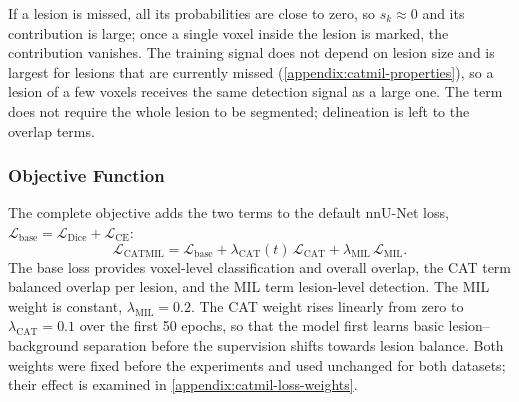 If a lesion is missed, all its probabilities are close to zero, so
$s_k \approx 0$ and its contribution is large; once a single voxel inside
the lesion is marked, the contribution vanishes. The training signal does
not depend on lesion size and is largest for lesions that are currently
missed (\cref{appendix:catmil-properties}), so a lesion of a few voxels
receives the same detection signal as a large one. The term does not
require the whole lesion to be segmented; delineation is left to the
overlap terms.

\subsubsection{Objective Function}

The complete objective adds the two terms to the default nnU-Net loss,
$\mathcal{L}_{\mathrm{base}} = \mathcal{L}_{\mathrm{Dice}} + \mathcal{L}_{\mathrm{CE}}$:
\begin{equation}
\mathcal{L}_{\mathrm{CATMIL}}
=
\mathcal{L}_{\mathrm{base}}
+
\lambda_{\mathrm{CAT}}(t)\, \mathcal{L}_{\mathrm{CAT}}
+
\lambda_{\mathrm{MIL}}\, \mathcal{L}_{\mathrm{MIL}} .
\label{eq:sl_catmil_loss}
\end{equation}
The base loss provides voxel-level classification and overall overlap, the
CAT term balanced overlap per lesion, and the MIL term lesion-level
detection. The MIL weight is constant, $\lambda_{\mathrm{MIL}}=0.2$. The
CAT weight rises linearly from zero to $\lambda_{\mathrm{CAT}}=0.1$ over
the first 50 epochs, so that the model first learns basic lesion--background
separation before the supervision shifts towards lesion balance. Both
weights were fixed before the experiments and used unchanged for both
datasets; their effect is examined in \cref{appendix:catmil-loss-weights}.

